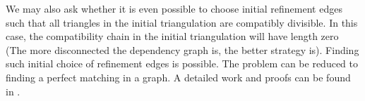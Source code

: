     We may also ask whether it is even possible to choose initial refinement edges such that all triangles in the initial triangulation are compatibly divisible. In this case, the compatibility chain in the initial triangulation will have length zero (The more disconnected the dependency graph is, the better strategy is).
    Finding such initial choice of refinement edges is possible. The problem can be reduced to finding a perfect matching in a graph. A detailed work and proofs can be found in \cite{mitchell1988unified,mitchell1991adaptive,mitchell201630}.
    

